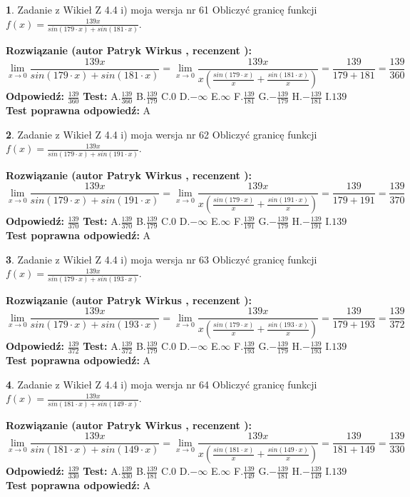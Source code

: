 \documentclass[12pt, a4paper]{article}
\theoremstyle{definition} %
\newtheorem{zad}{}
\newcommand{\zadStart}[1]{\begin{zad}#1\newline}
\newcommand{\zadStop}{\end{zad}}
\newcommand{\rozwStart}[2]{\noindent \textbf{Rozwiązanie (autor #1 , recenzent #2): }\newline}
\newcommand{\rozwStop}{\newline}
\newcommand{\odpStart}{\noindent \textbf{Odpowiedź:}\newline}
\newcommand{\odpStop}{\newline}
\newcommand{\testStart}{\noindent \textbf{Test:}\newline}
\newcommand{\testStop}{\newline}
\newcommand{\kluczStart}{\noindent \textbf{Test poprawna odpowiedź:}\newline}
\newcommand{\kluczStop}{\newline}
\begin{document}
\zadStart{Zadanie z Wikieł Z 4.4 i) moja wersja nr 61}
Obliczyć granicę funkcji $f(x)=\frac{139x}{sin(179\cdot x) +sin(181\cdot x)}$.
\zadStop
\rozwStart{Patryk Wirkus}{}
$$\lim\limits_{x\to 0}\frac{139x}{sin(179\cdot x) +sin(181\cdot x)}=\lim\limits_{x\to 0}\frac{139x}{x(\frac{sin(179\cdot x)}{x}+\frac{sin(181\cdot x)}{x})}=\frac{139}{179+181} = \frac{139}{360}$$
\rozwStop
\odpStart
$\frac{139}{360}$
\odpStop
\testStart
A.$\frac{139}{360}$
B.$\frac{139}{179}$
C.$0$
D.$-\infty$
E.$\infty$
F.$\frac{139}{181}$
G.$-\frac{139}{179}$
H.$-\frac{139}{181}$
I.$139$
\testStop
\kluczStart
A
\kluczStop



\zadStart{Zadanie z Wikieł Z 4.4 i) moja wersja nr 62}
Obliczyć granicę funkcji $f(x)=\frac{139x}{sin(179\cdot x) +sin(191\cdot x)}$.
\zadStop
\rozwStart{Patryk Wirkus}{}
$$\lim\limits_{x\to 0}\frac{139x}{sin(179\cdot x) +sin(191\cdot x)}=\lim\limits_{x\to 0}\frac{139x}{x(\frac{sin(179\cdot x)}{x}+\frac{sin(191\cdot x)}{x})}=\frac{139}{179+191} = \frac{139}{370}$$
\rozwStop
\odpStart
$\frac{139}{370}$
\odpStop
\testStart
A.$\frac{139}{370}$
B.$\frac{139}{179}$
C.$0$
D.$-\infty$
E.$\infty$
F.$\frac{139}{191}$
G.$-\frac{139}{179}$
H.$-\frac{139}{191}$
I.$139$
\testStop
\kluczStart
A
\kluczStop



\zadStart{Zadanie z Wikieł Z 4.4 i) moja wersja nr 63}
Obliczyć granicę funkcji $f(x)=\frac{139x}{sin(179\cdot x) +sin(193\cdot x)}$.
\zadStop
\rozwStart{Patryk Wirkus}{}
$$\lim\limits_{x\to 0}\frac{139x}{sin(179\cdot x) +sin(193\cdot x)}=\lim\limits_{x\to 0}\frac{139x}{x(\frac{sin(179\cdot x)}{x}+\frac{sin(193\cdot x)}{x})}=\frac{139}{179+193} = \frac{139}{372}$$
\rozwStop
\odpStart
$\frac{139}{372}$
\odpStop
\testStart
A.$\frac{139}{372}$
B.$\frac{139}{179}$
C.$0$
D.$-\infty$
E.$\infty$
F.$\frac{139}{193}$
G.$-\frac{139}{179}$
H.$-\frac{139}{193}$
I.$139$
\testStop
\kluczStart
A
\kluczStop



\zadStart{Zadanie z Wikieł Z 4.4 i) moja wersja nr 64}
Obliczyć granicę funkcji $f(x)=\frac{139x}{sin(181\cdot x) +sin(149\cdot x)}$.
\zadStop
\rozwStart{Patryk Wirkus}{}
$$\lim\limits_{x\to 0}\frac{139x}{sin(181\cdot x) +sin(149\cdot x)}=\lim\limits_{x\to 0}\frac{139x}{x(\frac{sin(181\cdot x)}{x}+\frac{sin(149\cdot x)}{x})}=\frac{139}{181+149} = \frac{139}{330}$$
\rozwStop
\odpStart
$\frac{139}{330}$
\odpStop
\testStart
A.$\frac{139}{330}$
B.$\frac{139}{181}$
C.$0$
D.$-\infty$
E.$\infty$
F.$\frac{139}{149}$
G.$-\frac{139}{181}$
H.$-\frac{139}{149}$
I.$139$
\testStop
\kluczStart
A
\kluczStop
\end{document}
